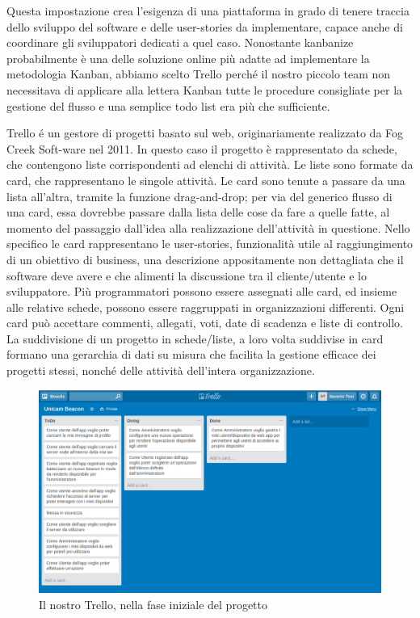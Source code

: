 Questa impostazione crea l'esigenza di una piattaforma in grado di tenere traccia dello sviluppo del software e delle user-stories da implementare, capace anche di coordinare gli sviluppatori dedicati a quel caso.
Nonostante kanbanize probabilmente è una delle soluzione online più adatte ad implementare la metodologia Kanban, abbiamo scelto Trello perché il nostro piccolo team non necessitava di applicare alla lettera Kanban tutte le procedure consigliate per la gestione del flusso e una semplice todo list era più che sufficiente.
 
Trello\cite{trello} é un gestore di progetti basato sul web, originariamente realizzato da Fog Creek Soft-ware nel 2011.
In questo caso il progetto è rappresentato da schede, che contengono liste corrispondenti ad elenchi di attività. 
Le liste sono formate da card, che rappresentano le singole attività. 
Le card sono tenute a passare da una lista all'altra, tramite la funzione drag-and-drop; per via del generico flusso di una card, essa dovrebbe passare dalla lista delle cose da fare a quelle fatte, al momento del passaggio dall'idea alla realizzazione dell'attività in questione.
Nello specifico le card rappresentano le user-stories, funzionalità utile al raggiungimento di un obiettivo di business, una descrizione appositamente non dettagliata che il software deve avere e che alimenti la discussione tra il cliente/utente e lo sviluppatore.
Più programmatori possono essere assegnati alle card, ed insieme alle relative schede, possono essere raggruppati in organizzazioni differenti. 
Ogni card può accettare commenti, allegati, voti, date di scadenza e liste di controllo.
La suddivisione di un progetto in schede/liste, a loro volta suddivise in card formano una gerarchia di dati su misura che facilita la gestione efficace dei progetti stessi, nonché delle attività dell'intera organizzazione.
\begin{figure}[h]
\centering
\includegraphics[scale=0.35]{Immagini/trello.png} 
\caption{Il nostro Trello, nella fase iniziale del progetto}
\end{figure}

